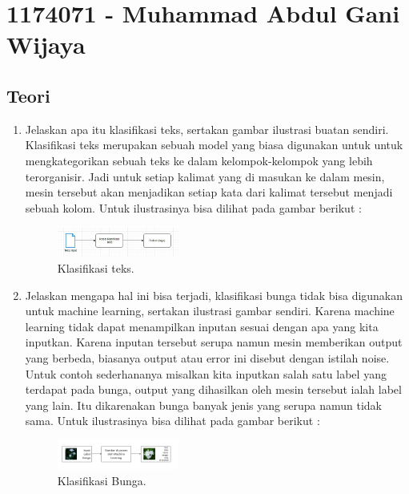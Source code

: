 \section{1174071 - Muhammad Abdul Gani Wijaya}
\subsection{Teori}
\begin{enumerate}

	\item Jelaskan apa itu klasifikasi teks, sertakan gambar ilustrasi buatan sendiri.
	\hfill\break
	Klasifikasi teks merupakan sebuah model yang biasa digunakan untuk untuk mengkategorikan sebuah teks ke dalam kelompok-kelompok yang lebih terorganisir. Jadi untuk setiap kalimat yang di masukan ke dalam mesin, mesin tersebut akan menjadikan setiap kata dari kalimat tersebut menjadi sebuah kolom. Untuk ilustrasinya bisa dilihat pada gambar berikut : 

	\begin{figure}[H]
	\centering
		\includegraphics[width=4cm]{figures/1174071/4/materi/1.PNG}
		\caption{Klasifikasi teks.}
	\end{figure}

	\item Jelaskan mengapa hal ini bisa terjadi, klasifikasi bunga tidak bisa digunakan untuk machine learning, sertakan ilustrasi gambar sendiri.
	\hfill\break
	Karena machine learning tidak dapat menampilkan inputan sesuai dengan apa yang kita inputkan. Karena inputan tersebut serupa namun mesin memberikan output yang berbeda, biasanya output atau error ini disebut dengan istilah noise. Untuk contoh sederhananya misalkan kita inputkan salah satu label yang terdapat pada bunga, output yang dihasilkan oleh mesin tersebut ialah label yang lain. Itu dikarenakan bunga banyak jenis yang serupa namun tidak sama. Untuk ilustrasinya bisa dilihat pada gambar berikut : 

	\begin{figure}[H]
	\centering
		\includegraphics[width=4cm]{figures/1174071/4/materi/2.PNG}
		\caption{Klasifikasi Bunga.}
	\end{figure}
	

\end{enumerate}
